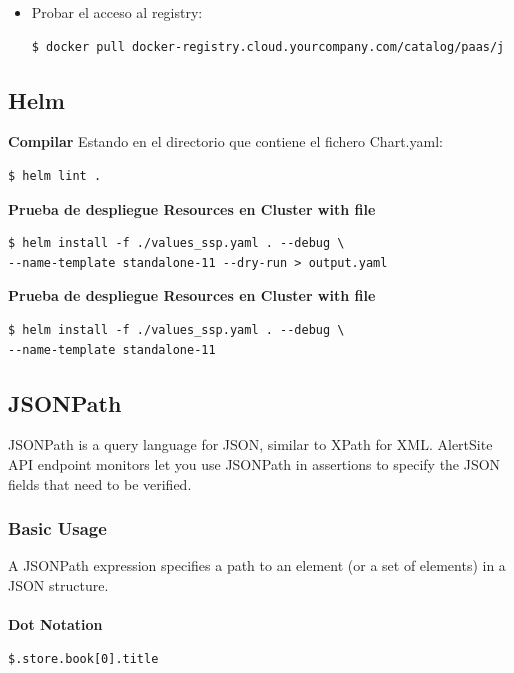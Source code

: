 \documentclass{article}
\newenvironment{codetemplate}[1][]{%
  \mybasecolorbox[#1]
  \itshape
}{%
  \endmybasecolorbox
}
\begin{document}
\begin{itemize}
    \item Probar el acceso al registry:
\begin{codetemplate}{}
\begin{verbatim}
$ docker pull docker-registry.cloud.yourcompany.com/catalog/paas/j
\end{verbatim}
\end{codetemplate} 
\end{itemize}

\subsection{Helm}
\textbf{Compilar}
\newline Estando en el directorio que contiene el fichero Chart.yaml:
\begin{codetemplate}{}
\begin{verbatim}
$ helm lint .
\end{verbatim}
\end{codetemplate}

\textbf{Prueba de despliegue Resources en Cluster with file}
\begin{codetemplate}{}
\begin{verbatim}
$ helm install -f ./values_ssp.yaml . --debug \
--name-template standalone-11 --dry-run > output.yaml
\end{verbatim}
\end{codetemplate}

\textbf{Prueba de despliegue Resources en Cluster with file}
\begin{codetemplate}{}
\begin{verbatim}
$ helm install -f ./values_ssp.yaml . --debug \
--name-template standalone-11
\end{verbatim}
\end{codetemplate}

\subsection{JSONPath}
JSONPath is a query language for JSON, similar to XPath for XML. AlertSite API endpoint monitors let you use JSONPath in assertions to specify the JSON fields that need to be verified.

\subsubsection{Basic Usage}
A JSONPath expression specifies a path to an element (or a set of elements) in a JSON structure. \\ \\
\textbf{Dot Notation}
\begin{codetemplate}{}
\begin{verbatim}
$.store.book[0].title
\end{verbatim}
\end{codetemplate}
\end{document}
